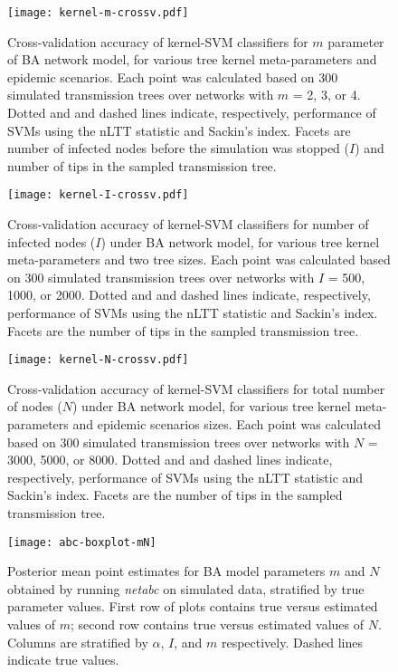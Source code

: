\documentclass[12pt]{article}\usepackage[]{graphicx}\usepackage[]{color}
\begin{document}
\begin{figure}[ht]
  \centering
  \texttt{[image: kernel-m-crossv.pdf]}
  \caption{Cross-validation accuracy of kernel-SVM classifiers for $m$
      parameter of BA network model, for various tree kernel
      meta-parameters and epidemic scenarios. Each point was calculated based
      on 300 simulated transmission trees over networks with $m$ = 2, 3, or 4.
      Dotted and and dashed lines indicate, respectively, performance of SVMs
      using the nLTT statistic and Sackin's index. Facets are number of
      infected nodes before the simulation was stopped ($I$) and number of tips
      in the sampled transmission tree.
  }
  \label{fig:mcrossv}
\end{figure}

\begin{figure}[ht]
  \centering
  \texttt{[image: kernel-I-crossv.pdf]}
  \caption{Cross-validation accuracy of kernel-SVM classifiers for number of
      infected nodes ($I$) under BA network model, for various tree
      kernel meta-parameters and two tree sizes. Each point was calculated
      based on 300 simulated transmission trees over networks with $I$ = 500,
      1000, or 2000. Dotted and and dashed lines indicate, respectively,
      performance of SVMs using the nLTT statistic and Sackin's index. Facets
      are the number of tips in the sampled transmission tree.
  }
  \label{fig:Icrossv}
\end{figure}

\begin{figure}[ht]
  \centering
  \texttt{[image: kernel-N-crossv.pdf]}
  \caption{Cross-validation accuracy of kernel-SVM classifiers for total number
      of nodes ($N$) under BA network model, for various tree kernel
      meta-parameters and epidemic scenarios sizes. Each point was calculated
      based on 300 simulated transmission trees over networks with $N$ = 3000,
      5000, or 8000. Dotted and and dashed lines indicate, respectively,
      performance of SVMs using the nLTT statistic and Sackin's index. Facets
      are the number of tips in the sampled transmission tree.
  }
  \label{fig:Ncrossv}
\end{figure}

\begin{figure}
    \texttt{[image: abc-boxplot-mN]}
    \caption[
        Posterior mean point estimates for BA model parameters $m$ and $N$
        obtained by running \textit{netabc} on simulated data, stratified by
        true parameter values.
    ]{
        Posterior mean point estimates for BA model parameters $m$ and $N$
        obtained by running \textit{netabc} on simulated data, stratified by
        true parameter values. First row of plots contains true versus
        estimated values of $m$; second row contains true versus estimated
        values of $N$. Columns are stratified by $\alpha$, $I$, and $m$
        respectively. Dashed lines indicate true values. 
    }
    \label{fig:abcpt2}
\end{figure}
\end{document}
